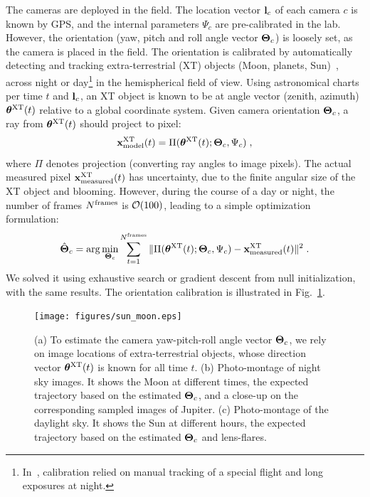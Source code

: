 \documentclass[runningheads]{llncs}
\begin{document}
The cameras are deployed in the field. The location vector ${\bf l}_c$
of each camera $c$ is known by GPS, and the internal parameters $\Psi_c$ are pre-calibrated in the lab. However, the orientation (yaw, pitch and roll angle vector ${\bf \Theta}_c$) is loosely set, as the camera is placed in the field. The orientation is calibrated by automatically detecting and tracking extra-terrestrial (XT) objects (Moon, planets, Sun)~\cite{Seiz2002,lalonde}, across night or day\footnote{In~\cite{Seiz2002}, calibration relied on manual tracking of a special flight and long exposures at night.} in the hemispherical field of view.  Using astronomical charts per time $t$ and ${\bf l}_c$, an XT object is known to be at angle vector (zenith, azimuth) ${\bm \theta}^{\rm XT}(t)$ relative to a global coordinate system. Given camera orientation ${\bf \Theta}_c$, a ray from ${\bm \theta}^{\rm XT}(t)$ should project to pixel:
\begin{equation}
{\bf x}^{\rm XT}_{\rm model}(t) = {\Pi}({\bm \theta}^{\rm XT}(t);{\bf \Theta}_c,\Psi_c)
\;,
 \label{eq:xt}
\end{equation}
where ${\Pi}$ denotes projection (converting ray angles to image pixels).
The actual measured pixel ${\bf x}^{\rm XT}_{\rm measured}(t)$ has uncertainty, due to the finite angular size of the XT object and blooming. However, during the course of a day or night, the number of frames
  $N^{\rm frames}$ is ${\cal O}(100)$, leading to a simple optimization formulation:
\begin{equation}
 \hat{\bf \Theta}_c=\arg\min_{{\bf \Theta}_c}
 \sum_{t=1}^{N^{\rm frames}}
 \|{\Pi}({\bm \theta}^{\rm XT}(t);{\bf \Theta}_c,\Psi_c) - {\bf x}^{\rm XT}_{\rm measured}(t)\|^2
\;.
 \label{eq:hatThetac}
\end{equation}
We solved it using exhaustive search or gradient descent from null initialization, with the same results. The orientation calibration is illustrated in Fig.~\ref{fig:sunmotion}.
\begin{figure}[t!]
\begin{center}
   \texttt{[image: figures/sun\_moon.eps]}
\end{center}
   \vspace{-0.6cm}
   \caption{(a) To estimate the camera yaw-pitch-roll angle vector ${\bf \Theta}_c$, we rely on
   image locations of extra-terrestrial objects, whose direction vector ${\bm \theta}^{\rm XT}(t)$
   is known for all time $t$. (b) Photo-montage of night sky images. It shows the Moon at different times, the expected trajectory based on the estimated ${\bf \Theta}_c$, and a close-up on the corresponding sampled images of Jupiter. (c) Photo-montage of the daylight sky. It shows the Sun at different hours, the expected trajectory based on the estimated ${\bf \Theta}_c$ and lens-flares.
   }
\label{fig:sunmotion}
\end{figure}
\end{document}
